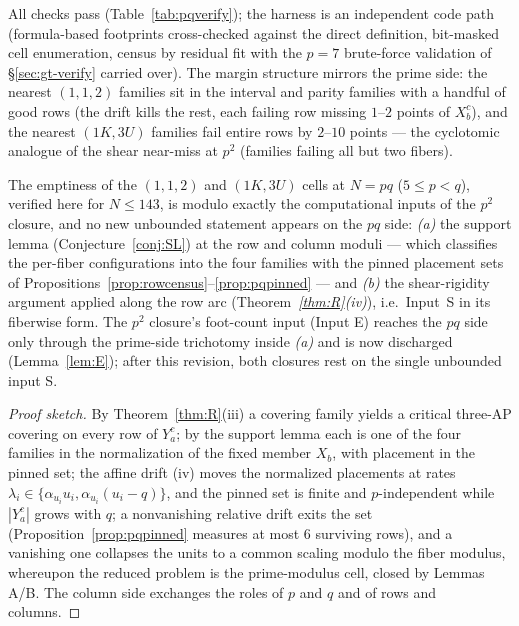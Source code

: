 All checks pass (Table~\ref{tab:pqverify}); the harness is an independent
code path (formula-based footprints cross-checked against the direct
definition, bit-masked cell enumeration, census by residual fit with the
$p=7$ brute-force validation of \S\ref{sec:gt-verify} carried over). The
margin structure mirrors the prime side: the nearest $(1,1,2)$ families sit
in the interval and parity families with a handful of good rows (the drift
kills the rest, each failing row missing $1$--$2$ points of $X_b^c$), and the
nearest $(1K,3U)$ families fail entire rows by $2$--$10$ points --- the
cyclotomic analogue of the shear near-miss at $p^2$ (families failing all
but two fibers).

\begin{corollary}\label{cor:pqdep}
The emptiness of the $(1,1,2)$ and $(1K,3U)$ cells at $N=pq$ ($5\le p<q$),
verified here for $N\le143$, is modulo exactly the computational inputs of
the $p^2$ closure, and no new unbounded statement appears on the $pq$
side: \emph{(a)} the support lemma (Conjecture~\ref{conj:SL}) at the row
and column moduli --- which classifies the per-fiber configurations into
the four families with the pinned placement sets of
Propositions~\ref{prop:rowcensus}--\ref{prop:pqpinned} --- and \emph{(b)}
the shear-rigidity argument applied along the row arc
(Theorem~\emph{\ref{thm:R}(iv)}), i.e.\ Input~S in its fiberwise form. The
$p^2$ closure's foot-count input (Input E) reaches the $pq$ side only
through the prime-side trichotomy inside \emph{(a)} and is now
discharged (Lemma~\ref{lem:E}); after this revision, both closures rest
on the single unbounded input S.
\end{corollary}

\begin{proof}[Proof sketch]
By Theorem~\ref{thm:R}(iii) a covering family yields a critical three-AP
covering on every row of $Y_a^{c}$; by the support lemma each is one of the
four families in the normalization of the fixed member $X_b$, with placement
in the pinned set; the affine drift (iv) moves the normalized placements at
rates $\lambda_i\in\{\alpha_{u_i}u_i,\alpha_{u_i}(u_i-q)\}$, and the pinned
set is finite and $p$-independent while $|Y_a^{c}|$ grows with $q$; a
nonvanishing relative drift exits the set (Proposition~\ref{prop:pqpinned}
measures at most $6$ surviving rows), and a vanishing one collapses the units
to a common scaling modulo the fiber modulus, whereupon the reduced problem
is the prime-modulus cell, closed by Lemmas A/B. The column side exchanges
the roles of $p$ and $q$ and of rows and columns.
\end{proof}

